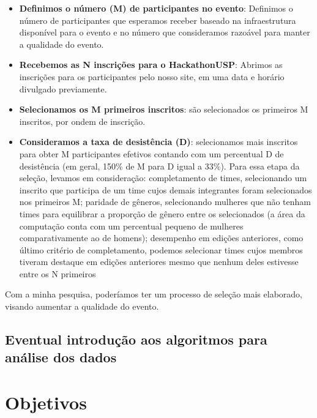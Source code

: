 \documentclass[10pt,twoside,a4paper]{article}
\begin{document}
    \begin{itemize}
      \item \textbf{Definimos o número (M) de participantes no evento}: Definimos o número de participantes que esperamos receber baseado na infraestrutura disponível para o evento e no número que consideramos razoável para manter a qualidade do evento.

      \item \textbf{Recebemos as N inscrições para o HackathonUSP}: Abrimos as inscrições para os participantes pelo nosso site, em uma data e horário divulgado previamente.
      
      \item \textbf{Selecionamos os M primeiros inscritos}: são selecionados os primeiros M inscritos, por ondem de inscrição.
      
      \item \textbf{Consideramos a taxa de desistência (D)}: selecionamos mais inscritos para obter M participantes efetivos contando com um percentual D de desistência (em geral, 150\% de M para D igual a 33\%). Para essa etapa da seleção, levamos em consideração: completamento de times, selecionando um inscrito que participa de um time cujos demais integrantes foram selecionados nos primeiros M; paridade de gêneros, selecionando mulheres que não tenham times para equilibrar a proporção de gênero entre os selecionados (a área da computação conta com um percentual pequeno de mulheres comparativamente ao de homens); desempenho em edições anteriores, como último critério de completamento, podemos selecionar times cujos membros tiveram destaque em edições anteriores mesmo que nenhum deles estivesse entre os N primeiros
    \end{itemize}
    
    Com a minha pesquisa, poderíamos ter um processo de seleção mais elaborado, visando aumentar a qualidade do evento.
    

  \subsection{Eventual introdução aos algoritmos para análise dos dados}
    

\section{Objetivos}
\end{document}
